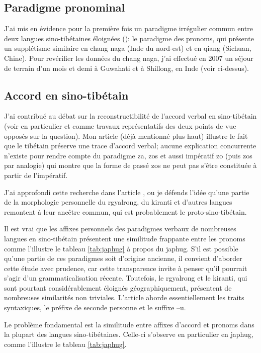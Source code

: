 \documentclass[oldfontcommands,oneside,a4paper,11pt]{memoir}
\newcommand{\ipa}[1]{{\phon #1}} %
\begin{document}
	\subsection{Paradigme pronominal}
J’ai mis en évidence pour la première fois un paradigme irrégulier commun entre deux langues sino-tibétaines éloignées (\citealt{jacques07chang}): le paradigme des pronoms, qui présente un supplétisme similaire en chang naga (Inde du nord-est) et en qiang (Sichuan, Chine). Pour revérifier les données du chang naga, j’ai effectué en 2007 un séjour de terrain d’un mois et demi à Guwahati et à Shillong, en Inde (voir ci-dessus).

\subsection{Accord en sino-tibétain}
J'ai contribué au débat sur la reconstructibilité de l'accord verbal en sino-tibétain (voir en particulier \citet{lapolla03} et \citet{delancey10agreement} comme travaux représentatifs des deux points de vue opposés sur la question). Mon article \citet{jacques10zos} (déjà mentionné plus haut) illustre le fait que le tibétain préserve une trace d'accord verbal; aucune explication concurrente n'existe pour rendre compte du paradigme \ipa{za}, \ipa{zos} et aussi impératif \ipa{zo} (puis \ipa{zos} par analogie) qui montre que la forme de passé \ipa{zos} ne peut pas s'être constituée à partir de l'impératif.

J'ai approfondi cette recherche   dans l'article \citet{jacques12agreement}, ou je défends l'idée qu'une partie de la morphologie personnelle du rgyalrong, du kiranti et d'autres langues remontent à leur ancêtre commun, qui est probablement le proto-sino-tibétain.

Il est vrai que les affixes personnels des paradigmes verbaux  de nombreuses langues en sino-tibétain présentent une similitude frappante entre les pronoms  comme l'illustre le  tableau \ref{tab:japhug} à propos du japhug. S'il est possible qu'une partie de ces paradigmes soit d'origine ancienne, il convient d'aborder cette étude avec prudence, car cette transparence invite à penser qu'il pourrait s'agir d'un grammaticalisation récente. Toutefois, le rgyalrong et le kiranti, qui sont pourtant considérablement éloignés géographiquement, présentent de nombreuses similarités non triviales. L'article \citet{jacques12agreement} aborde essentiellement les traits syntaxiques, le préfixe de seconde personne et le suffixe --u.

Le problème fondamental est la similitude entre affixes d'accord et pronoms dans la plupart des langues sino-tibétaines. Celle-ci s'observe en particulier en japhug, comme l'illustre le tableau \ref{tab:japhug}.
\end{document}
